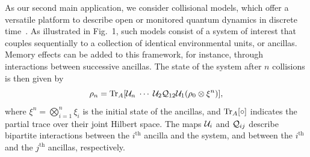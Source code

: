 \documentclass[aps,prl,reprint]{revtex4-2}
\begin{document}
As our second main application, we consider collisional models, which offer a versatile platform to describe open or monitored quantum dynamics in discrete time~\cite{ciccarelloQuantumCollisionModels2022}.
As illustrated in Fig.~1, such models consist of a system of interest that couples sequentially to a collection of identical environmental units, or ancillas.
Memory effects can be added to this framework, for instance, through interactions between successive ancillas.
The state of the system after $n$ collisions is then given by
\begin{equation}
	\rho_n = \mathrm{Tr}_A[\mathcal{U}_n \;\cdots\; \mathcal{U}_2\mathcal{Q}_{12}\mathcal{U}_1(\rho_0 \otimes\xi^n)],
\end{equation}
where $\xi^n = \bigotimes_{i=1}^n\xi_i$ is the initial state of the ancillas, and $\mathrm{Tr}_A[\circ]$ indicates the partial trace over their joint Hilbert space.
The maps $\mathcal{U}_i$ and $\mathcal{Q}_{ij}$ describe bipartite interactions between the $i^\mathrm{th}$ ancilla and the system, and between the $i^\mathrm{th}$ and the $j^\mathrm{th}$ ancillas, respectively.
\end{document}
